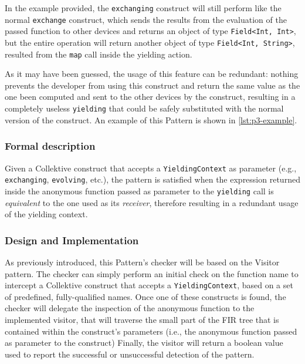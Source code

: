 \documentclass[12pt,a4paper,openright,twoside]{book}
\begin{document}
In the example provided, the \lstinline{exchanging} construct will still perform
like the normal \lstinline{exchange} construct, which sends the results from the
evaluation of the passed function to other devices and returns an object of type
\lstinline{Field<Int, Int>}, but the entire operation will return another object
of type \lstinline{Field<Int, String>}, resulted from the \lstinline{map} call
inside the yielding action.

As it may have been guessed, the usage of this feature can be redundant: nothing
prevents the developer from using this construct and return the same value as the
one been computed and sent to the other devices by the construct, resulting in a 
completely useless \lstinline{yielding} that could be safely substituted with the
normal version of the construct. 
%
An example of this Pattern is shown in \cref{lst:p3-example}.



\subsubsection{Formal description}

Given a Collektive construct that accepts a \lstinline{YieldingContext} as
parameter (e.g., \lstinline{exchanging}, \lstinline{evolving}, etc.), the
pattern is satisfied when the expression returned inside the anonymous function
passed as parameter to the \lstinline{yielding} call is \emph{equivalent} to the
one used as its \emph{receiver}, therefore resulting in a redundant usage of the
yielding context. 

\subsubsection{Design and Implementation}

As previously introduced, this Pattern's checker will be based on the Visitor
pattern. The checker can simply perform an initial check on the function name to
intercept a Collektive construct that accepts a \lstinline{YieldingContext},
based on a set of predefined, fully-qualified names. 
%
Once one of these constructs is found, the checker will delegate the inspection
of the anonymous function to the implemented visitor, that will traverse the
small part of the \ac{FIR} tree that is contained within the construct's
parameters (i.e., the anonymous function passed as parameter to the construct)
%
Finally, the visitor will return a boolean value used to report the successful
or unsuccessful detection of the pattern.
\end{document}
